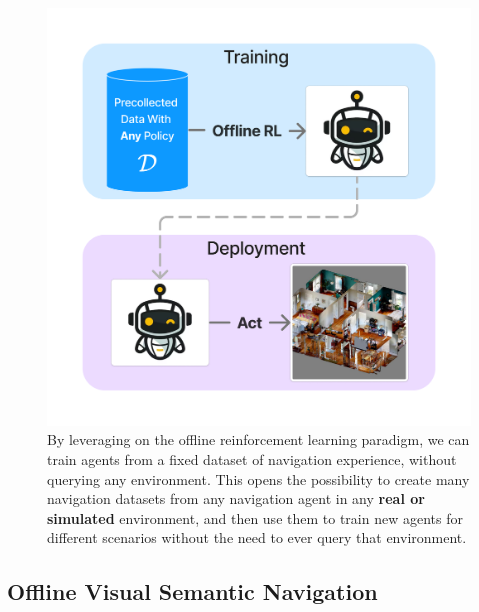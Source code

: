 \begin{figure}
    \centering
    \includegraphics[width=.8\linewidth]{figures/offnav/graphical_abstract}
    \caption{
    By leveraging on the offline reinforcement learning paradigm, we can train agents from a fixed dataset of navigation experience, without querying any environment.
    This opens the possibility to create many navigation datasets from any navigation agent in any \textbf{real or simulated} environment, and then use them to train new agents for different scenarios without the need to ever query that environment.
    }
    \label{fig:abstract_offnav}
\end{figure}




\subsection{Offline Visual Semantic Navigation}\label{subsec:offline-navigation}

